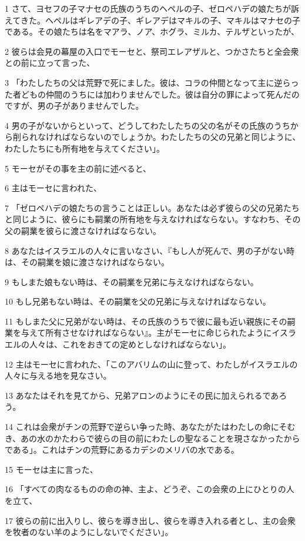 \par 1 さて、ヨセフの子マナセの氏族のうちのヘペルの子、ゼロペハデの娘たちが訴えてきた。ヘペルはギレアデの子、ギレアデはマキルの子、マキルはマナセの子である。その娘たちは名をマアラ、ノア、ホグラ、ミルカ、テルザといったが、
\par 2 彼らは会見の幕屋の入口でモーセと、祭司エレアザルと、つかさたちと全会衆との前に立って言った、
\par 3 「わたしたちの父は荒野で死にました。彼は、コラの仲間となって主に逆らった者どもの仲間のうちには加わりませんでした。彼は自分の罪によって死んだのですが、男の子がありませんでした。
\par 4 男の子がないからといって、どうしてわたしたちの父の名がその氏族のうちから削られなければならないのでしょうか。わたしたちの父の兄弟と同じように、わたしたちにも所有地を与えてください」。
\par 5 モーセがその事を主の前に述べると、
\par 6 主はモーセに言われた、
\par 7 「ゼロペハデの娘たちの言うことは正しい。あなたは必ず彼らの父の兄弟たちと同じように、彼らにも嗣業の所有地を与えなければならない。すなわち、その父の嗣業を彼らに渡さなければならない。
\par 8 あなたはイスラエルの人々に言いなさい、『もし人が死んで、男の子がない時は、その嗣業を娘に渡さなければならない。
\par 9 もしまた娘もない時は、その嗣業を兄弟に与えなければならない。
\par 10 もし兄弟もない時は、その嗣業を父の兄弟に与えなければならない。
\par 11 もしまた父に兄弟がない時は、その氏族のうちで彼に最も近い親族にその嗣業を与えて所有させなければならない』。主がモーセに命じられたようにイスラエルの人々は、これをおきての定めとしなければならない」。
\par 12 主はモーセに言われた、「このアバリムの山に登って、わたしがイスラエルの人々に与える地を見なさい。
\par 13 あなたはそれを見てから、兄弟アロンのようにその民に加えられるであろう。
\par 14 これは会衆がチンの荒野で逆らい争った時、あなたがたはわたしの命にそむき、あの水のかたわらで彼らの目の前にわたしの聖なることを現さなかったからである」。これはチンの荒野にあるカデシのメリバの水である。
\par 15 モーセは主に言った、
\par 16 「すべての肉なるものの命の神、主よ、どうぞ、この会衆の上にひとりの人を立て、
\par 17 彼らの前に出入りし、彼らを導き出し、彼らを導き入れる者とし、主の会衆を牧者のない羊のようにしないでください」。
